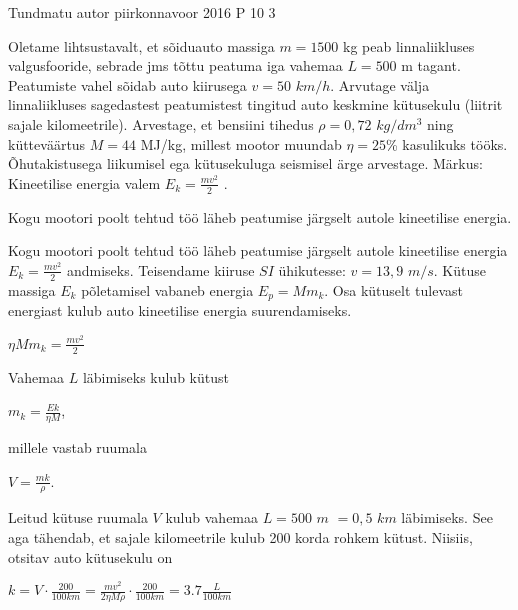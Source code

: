 {Tundmatu autor} %
{piirkonnavoor} %
{2016} %
{P 10} %
{3} %
{
\ifStatement
Oletame lihtsustavalt, et sõiduauto massiga $m = 1500$ kg peab linnaliikluses valgusfooride, sebrade jms tõttu peatuma iga vahemaa $L = 500$ m tagant. Peatumiste vahel sõidab auto kiirusega $v = 50$ $km/h$. Arvutage välja linnaliikluses sagedastest peatumistest tingitud auto keskmine kütusekulu (liitrit sajale kilomeetrile). Arvestage, et bensiini tihedus $\rho = 0,72$ $kg/dm^3$ ning kütteväärtus $M = 44$ MJ/kg, millest mootor muundab $\eta = 25$\% kasulikuks tööks. Õhutakistusega liikumisel ega kütusekuluga seismisel ärge arvestage. Märkus: Kineetilise energia valem $E_k = \frac{mv^2}{2}$ .\fi
\fi


\ifHint
Kogu mootori poolt tehtud töö läheb peatumise järgselt autole kineetilise energia.
\fi

\ifSolution
Kogu mootori poolt tehtud töö läheb peatumise järgselt autole kineetilise energia $E_k = \frac{mv^2}{2}$ andmiseks. Teisendame kiiruse $SI$ ühikutesse: $v = 13,9$ $m/s$. Kütuse massiga $E_k$ põletamisel vabaneb energia $E_p = M m_k$. Osa kütuselt tulevast energiast kulub auto kineetilise energia suurendamiseks.
\begin{center}
$\eta M m_k = \frac{mv^2}{2}$
\end{center}
Vahemaa $L$ läbimiseks kulub kütust 
\begin{center}
$m_k = \frac{Ek}{\eta M}$, 
\end{center}
millele vastab ruumala 
\begin{center}
$V =\frac{mk}{\rho}$.
\end{center}
Leitud kütuse ruumala $V$ kulub vahemaa $L = 500$ $m$ $= 0,5$ $km$ läbimiseks. See aga tähendab, et sajale kilomeetrile kulub 200 korda rohkem kütust. Niisiis, otsitav auto kütusekulu on
\begin{center}
$k = V \cdot \frac{200}{100km} = \frac{mv^2}{2 \eta M \rho} \cdot \frac{200}{100km} = 3.7 \frac{L}{100km}$
\end{center}
\fi
}